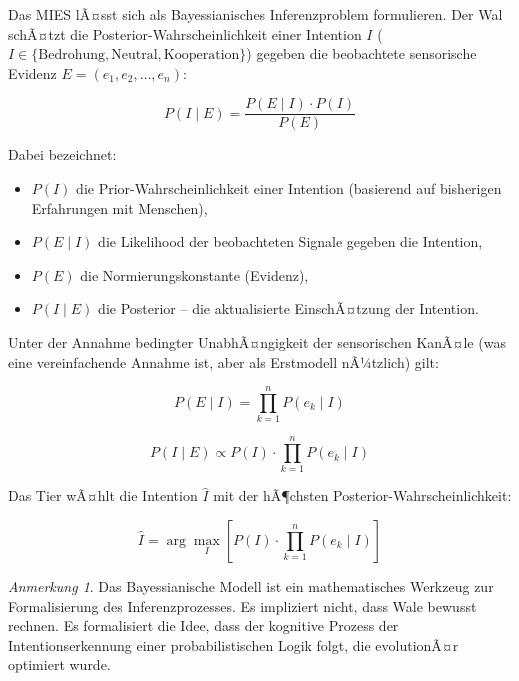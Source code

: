 ﻿\documentclass[12pt,a4paper]{article}
\theoremstyle{definition}
\theoremstyle{remark}
\newtheorem{anmerkung}{Anmerkung}[section]
\begin{document}
Das MIES lÃ¤sst sich als Bayessianisches Inferenzproblem formulieren.
Der Wal schÃ¤tzt die Posterior-Wahrscheinlichkeit einer Intention $I$
($I \in \{\text{Bedrohung}, \text{Neutral}, \text{Kooperation}\}$)
gegeben die beobachtete sensorische Evidenz $E = (e_1, e_2, \ldots, e_n)$:

\begin{equation}
  P(I \mid E) = \frac{P(E \mid I) \cdot P(I)}{P(E)}
  \label{eq:bayes}
\end{equation}

Dabei bezeichnet:
\begin{itemize}
  \item $P(I)$ die Prior-Wahrscheinlichkeit einer Intention (basierend auf
        bisherigen Erfahrungen mit Menschen),
  \item $P(E \mid I)$ die Likelihood der beobachteten Signale gegeben
        die Intention,
  \item $P(E)$ die Normierungskonstante (Evidenz),
  \item $P(I \mid E)$ die Posterior -- die aktualisierte EinschÃ¤tzung
        der Intention.
\end{itemize}

Unter der Annahme bedingter UnabhÃ¤ngigkeit der sensorischen KanÃ¤le
(was eine vereinfachende Annahme ist, aber als Erstmodell nÃ¼tzlich) gilt:

\begin{equation}
  P(E \mid I) = \prod_{k=1}^{n} P(e_k \mid I)
  \label{eq:likelihood}
\end{equation}

\begin{equation}
  P(I \mid E) \propto P(I) \cdot \prod_{k=1}^{n} P(e_k \mid I)
  \label{eq:posterior}
\end{equation}

Das Tier wÃ¤hlt die Intention $\hat{I}$ mit der hÃ¶chsten Posterior-Wahrscheinlichkeit:

\begin{equation}
  \hat{I} = \arg\max_{I} \left[ P(I) \cdot \prod_{k=1}^{n} P(e_k \mid I) \right]
  \label{eq:map}
\end{equation}

\begin{anmerkung}
  Das Bayessianische Modell ist ein mathematisches Werkzeug zur Formalisierung
  des Inferenzprozesses. Es impliziert nicht, dass Wale bewusst rechnen.
  Es formalisiert die Idee, dass der kognitive Prozess der Intentionserkennung
  einer probabilistischen Logik folgt, die evolutionÃ¤r optimiert wurde.
\end{anmerkung}
\end{document}
